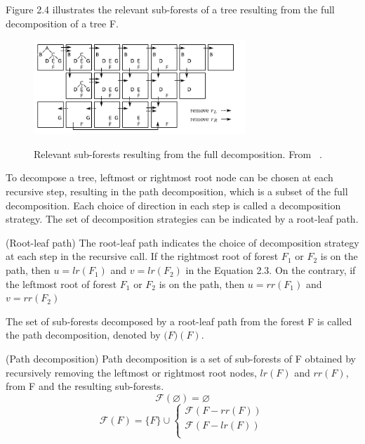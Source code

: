 Figure 2.4 illustrates the relevant sub-forests of a tree resulting from the full decomposition of a tree F.
\begin{figure}
		\centering
		\includegraphics[width=8cm,clip]{Figures/FullDecomposition}
		\label{Relevant Sub-forests Resulting From the Full Decomposition} 
		\caption{Relevant sub-forests resulting from the full decomposition. From ~\cite{pawlik2015efficient}.}
\end{figure}

To decompose a tree, leftmost or rightmost root node can be chosen at each recursive step, resulting in the path decomposition, which is a subset of the full decomposition. Each choice of direction in each step is called a decomposition strategy. The set of decomposition strategies can be indicated by a root-leaf path.

\begin{definition}
(Root-leaf path)
The root-leaf path indicates the choice of decomposition strategy at each step in the recursive call. If the rightmost root of forest $F_1$ or $F_2$ is on the path, then $u = lr(F_1)$ and $v = lr(F_2)$ in the Equation 2.3. On the contrary, if the leftmost root of forest $F_1$ or $F_2$ is on the path, then $u = rr(F_1)$ and $v = rr(F_2)$
\end{definition}

The set of sub-forests decomposed by a root-leaf path from the forest F is called the path decomposition, denoted by $\mathcal(F)(F)$.

\begin{definition}
(Path decomposition) Path decomposition is a set of sub-forests of F obtained by recursively removing the leftmost or rightmost root nodes, $lr(F)$ and $rr(F)$, from F and the resulting sub-forests. 
\begin{equation*}
\mathcal{F}(\varnothing) = \varnothing
\end{equation*}
\begin{equation*}
\mathcal{F}(F) = \{F\} \cup \begin{cases}
	  	\mathcal{F}(F - rr(F))\\ 
      	\mathcal{F}(F - lr(F))\\ 
    \end{cases}
\end{equation*}
\end{definition}




